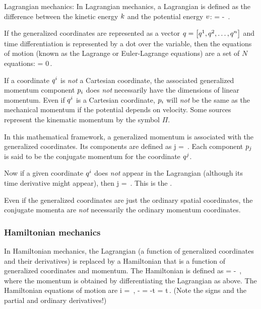 Lagrangian mechanics: In Lagrangian mechanics, a Lagrangian is defined as the difference between the kinetic energy $k$ and the potential energy $v$:
\beq
\lag = \ken - \pen\,.
\eeq

If the generalized coordinates are represented as a vector $q = \left[{{q}^{1},{q}^{2},\dotsc,{q}^{n}}\right]$ and time differentiation is represented by a dot over the variable, then the equations of motion (known as the Lagrange or Euler-Lagrange equations) are a set of $N$ equations:
\beq
{} = 0\,.
\eeq

If a coordinate ${q}^{i}$ is \emph{not} a Cartesian coordinate, the associated generalized momentum component ${p}_{i}$ does \emph{not} necessarily have the dimensions of linear momentum. Even if ${q}^{i}$ is a Cartesian coordinate, ${p}_{i}$ will \emph{not} be the same as the mechanical momentum if the potential depends on velocity. Some sources represent the kinematic momentum by the symbol $\Pi$.

In this mathematical framework, a generalized momentum is associated with the generalized coordinates. Its components are defined as
\beq
\gmom j = \,.
\eeq
Each component ${p}_{j}$ is said to be the conjugate momentum for the coordinate ${q}^{j}$.

Now if a given coordinate ${q}^{i}$ does \emph{not} appear in the Lagrangian (although its time derivative might appear), then
\beq
\gmom j = \,.
\eeq
This is the .

Even if the generalized coordinates are just the ordinary spatial coordinates, the conjugate momenta are \emph{not} necessarily the ordinary momentum coordinates.


\subsubsection{Hamiltonian mechanics}
In Hamiltonian mechanics, the Lagrangian (a function of generalized coordinates and their derivatives) is replaced by a Hamiltonian that is a function of generalized coordinates and momentum. The Hamiltonian is defined as
\beq
\ham{} = \lmom\iprod\dt\gpvec - \lag{} \,,
\eeq
where the momentum is obtained by differentiating the Lagrangian as above. The Hamiltonian equations of motion are
\beq
      \gvel i = \,,\qquad
- = \qquad{}\qquad
  -\xpd\lag t = \xod\ham t\,.
\eeq
(Note the signs and the partial and ordinary derivatives!)

